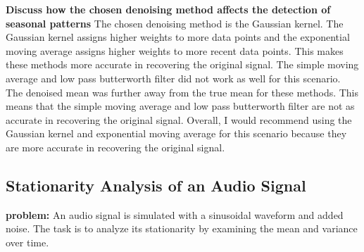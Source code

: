 \documentclass[a4paper,12pt]{article} %
\begin{document}
\newline\newline
\textbf{Discuss how the chosen denoising method affects the detection of seasonal patterns}
The chosen denoising method is the Gaussian kernel. The Gaussian kernel assigns higher weights to more data points and the exponential moving average assigns higher weights to more recent data points. This makes these methods more accurate in recovering the original signal. The simple moving average and low pass butterworth filter did not work as well for this scenario. The denoised mean was further away from the true mean for these methods. This means that the simple moving average and low pass butterworth filter are not as accurate in recovering the original signal. Overall, I would recommend using the Gaussian kernel and exponential moving average for this scenario because they are more accurate in recovering the original signal.

\subsection{Stationarity Analysis of an Audio Signal}
\textbf{problem: } An audio signal is simulated with a sinusoidal waveform and added noise.
The task is to analyze its stationarity by examining the mean and variance over time.
\end{document}
